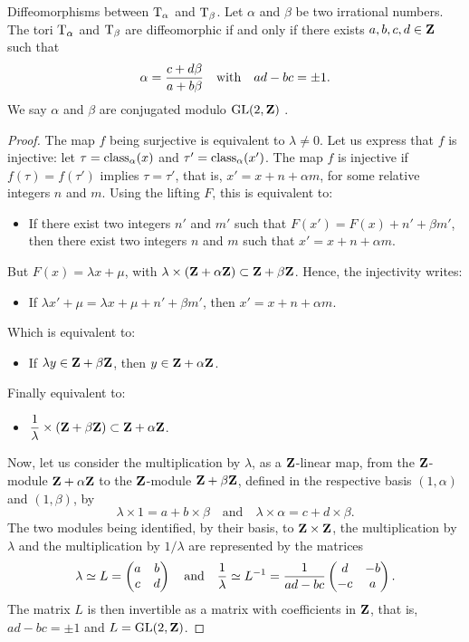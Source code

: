 \begin{Article}{Diffeomorphisms between $\mathrm{T}_\alpha$ and $\mathrm{T}_\beta$.}{}
  Let $\alpha$ and $\beta$ be two irrational numbers.
  The tori $\mathrm{T}_\alpha$ and $\mathrm{T}_\beta$ are diffeomorphic if and only if there exists  $a,b,c,d \in \mathbf{Z}$ such that
  $$%
    \alpha = {c + d \beta \over a + b \beta}
    \quad \text{with} \quad
    ad-bc = \pm 1.
    $$%
  We say $\alpha$ and $\beta$ are conjugated modulo $\mathrm{GL}(2,\mathbf{Z})$ \cite{DI83}.
\end{Article}

\begin{proof}
  The map $f$ being surjective is equivalent to $\lambda \neq 0$.
  Let us express that $f$ is injective:
  let $\tau = \operatorname{class}_\alpha(x)$ and  $\tau' = \operatorname{class}_\alpha(x')$.
  The map $f$ is injective if  $f(\tau) = f(\tau')$ implies $\tau = \tau'$,
  that is,
  $x' = x + n + \alpha m$,
  for some relative integers $n$ and $m$.
  Using the lifting $F$,
  this is equivalent to:
  \begin{itemize}
    \item[]  If there exist two integers $n'$ and $m'$ such that $F(x') = F(x) + n' + \beta m'$,
    then there exist two integers $n$ and $m$ such that $x' = x + n + \alpha m$.
  \end{itemize}
  But $F(x) = \lambda x + \mu$,
  with $\lambda \times (\mathbf{Z} + \alpha \mathbf{Z}) \subset \mathbf{Z} + \beta \mathbf{Z}$.
  Hence,
  the injectivity writes:
  \begin{itemize}
    \item[] If $\lambda x' + \mu = \lambda x + \mu + n' + \beta m'$,
    then $x' = x + n + \alpha m$.
  \end{itemize}
  Which is equivalent to:
  \begin{itemize}
    \item[] If $\lambda y \in \mathbf{Z} + \beta \mathbf{Z}$,
    then $y \in \mathbf{Z} + \alpha \mathbf{Z}$.
  \end{itemize}
  Finally equivalent to:
  \begin{itemize}
    \item[] $\displaystyle{1 \over \lambda} \times (\mathbf{Z} + \beta \mathbf{Z}) \subset \mathbf{Z} + \alpha \mathbf{Z}$.
  \end{itemize}
  Now,
  let us consider the multiplication by $\lambda$,
  as a $\mathbf{Z}$-linear map,
  from the $\mathbf{Z}$-module $\mathbf{Z} + \alpha \mathbf{Z}$ to the $\mathbf{Z}$-module $\mathbf{Z} + \beta \mathbf{Z}$,
  defined in the respective basis $(1,\alpha)$ and $(1, \beta)$,
  by
  $$%
    \lambda \times 1 = a + b \times \beta
    \quad \text{and} \quad
    \lambda \times \alpha = c + d \times \beta.
    $$%
  The two modules being identified,
  by their basis,
  to $\mathbf{Z} \times \mathbf{Z}$,
  the multiplication by $\lambda$ and the multiplication by $1/\lambda$ are represented by the matrices
  $$%
    \lambda \simeq L = \Vector{a & b \\ c & d}
    \quad \text{and} \quad
    {1 \over \lambda} \simeq  L^{-1} = {1 \over ad - bc} \Vector{d & -b \\ -c & a}.
    $$%
  The matrix $L$ is then invertible as a matrix with coefficients in $\mathbf{Z}$,
  that is,
  $ad - bc = \pm 1$ and $L = \mathrm{GL}(2,\mathbf{Z})$.
\end{proof}

